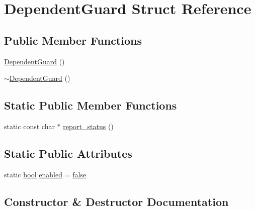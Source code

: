 \hypertarget{struct_dependent_guard}{}\section{Dependent\+Guard Struct Reference}
\label{struct_dependent_guard}
\subsection*{Public Member Functions}
\begin{DoxyCompactItemize}
\item 
\mbox{\hyperlink{struct_dependent_guard_a117f2d61f00a5a5d29434f3413701248}{Dependent\+Guard}} ()
\item 
\mbox{\hyperlink{struct_dependent_guard_a44db8266cbc624255e05bed92b9d1c2c}{$\sim$\+Dependent\+Guard}} ()
\end{DoxyCompactItemize}
\subsection*{Static Public Member Functions}
\begin{DoxyCompactItemize}
\item 
static const char $\ast$ \mbox{\hyperlink{struct_dependent_guard_a891c08bb77af85b9772c75cc67d5487a}{report\+\_\+status}} ()
\end{DoxyCompactItemize}
\subsection*{Static Public Attributes}
\begin{DoxyCompactItemize}
\item 
static \mbox{\hyperlink{asdl_8h_af6a258d8f3ee5206d682d799316314b1}{bool}} \mbox{\hyperlink{struct_dependent_guard_a23268fb89a00928e483fbca9a04cb3d5}{enabled}} = \mbox{\hyperlink{asdl_8h_af6a258d8f3ee5206d682d799316314b1ae9de385ef6fe9bf3360d1038396b884c}{false}}
\end{DoxyCompactItemize}


\subsection{Constructor \& Destructor Documentation}
\mbox{\label{struct_dependent_guard_a117f2d61f00a5a5d29434f3413701248}} 
